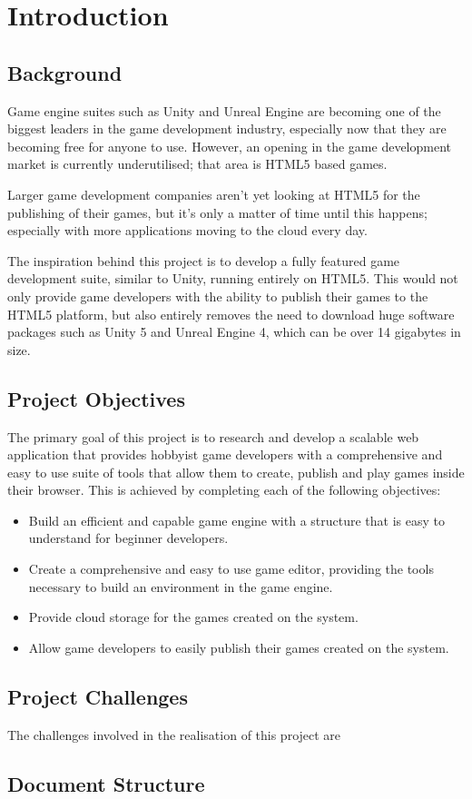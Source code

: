 \chapter{Introduction}
\section{Background}
Game engine suites such as Unity and Unreal Engine are becoming one of the biggest leaders in the game development industry, especially now that they are becoming free for anyone to use. However, an opening in the game development market is currently underutilised; that area is HTML5 based games. 

Larger game development companies aren't yet looking at HTML5 for the publishing of their games, but it's only a matter of time until this happens; especially with more applications moving to the cloud every day.

The inspiration behind this project is to develop a fully featured game development suite, similar to Unity, running entirely on HTML5. This would not only provide game developers with the ability to publish their games to the HTML5 platform, but also entirely removes the need to download huge software packages such as Unity 5 and Unreal Engine 4, which can be over 14 gigabytes in size.

\section{Project Objectives}
The primary goal of this project is to research and develop a scalable web application that provides hobbyist game developers with a comprehensive and easy to use suite of tools that allow them to create, publish and play games inside their browser. This is achieved by completing each of the following objectives:

\begin{itemize}
	\itemsep-0.7em
	\item Build an efficient and capable game engine with a structure that is easy to understand for beginner developers.
	\item Create a comprehensive and easy to use game editor, providing the tools necessary to build an environment in the game engine.
	\item Provide cloud storage for the games created on the system.
	\item Allow game developers to easily publish their games created on the system.
\end{itemize}

\section{Project Challenges}
The challenges involved in the realisation of this project are 

% 
% 
% 


\section{Document Structure}

